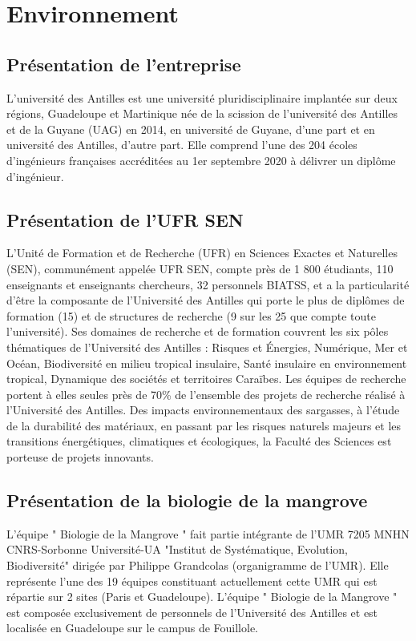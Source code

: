 \chapter{Environnement}
\minitoc

    \section{Présentation de l'entreprise}
    L’université des Antilles est une université pluridisciplinaire implantée sur deux régions, Guadeloupe et Martinique née de la scission de l’université des Antilles et de la Guyane (UAG) en 2014, en université de Guyane, d’une part et en université des Antilles, d’autre part.
    Elle comprend l'une des 204 écoles d'ingénieurs françaises accréditées au 1er septembre 2020 à délivrer un diplôme d'ingénieur.

    \section{Présentation de l'UFR SEN}
    L’Unité de Formation et de Recherche (UFR) en Sciences Exactes et Naturelles (SEN), communément appelée UFR SEN, compte près de 1 800 étudiants, 110 enseignants et enseignants chercheurs, 32 personnels BIATSS, et a la particularité d’être la composante de l’Université des Antilles qui porte le plus de diplômes de formation (15) et de structures de recherche (9 sur les 25 que compte toute l’université). 
    Ses domaines de recherche et de formation couvrent les six pôles thématiques de l’Université des Antilles : Risques et Énergies, Numérique, Mer et Océan, Biodiversité en milieu tropical insulaire, Santé insulaire en environnement tropical, Dynamique des sociétés et territoires Caraïbes.
    Les équipes de recherche portent à elles seules près de 70\% de l’ensemble des projets de recherche réalisé à l’Université des Antilles.
    Des impacts environnementaux des sargasses, à l’étude de la durabilité des matériaux, en passant par les risques naturels majeurs et les transitions énergétiques, climatiques et écologiques, la Faculté des Sciences est porteuse de projets innovants. 

    \vspace{2cm}

    \section{Présentation de la biologie de la mangrove}
    L'équipe " Biologie de la Mangrove " fait partie intégrante de l'UMR 7205 MNHN CNRS-Sorbonne Université-UA "Institut de Systématique, Evolution, Biodiversité" dirigée par Philippe Grandcolas (organigramme de l'UMR).
    Elle représente l'une des 19 équipes constituant actuellement cette UMR qui est répartie sur 2 sites (Paris et Guadeloupe). L'équipe " Biologie de la Mangrove " est composée exclusivement de personnels de l'Université des Antilles et est localisée en Guadeloupe sur le campus de Fouillole.
    
